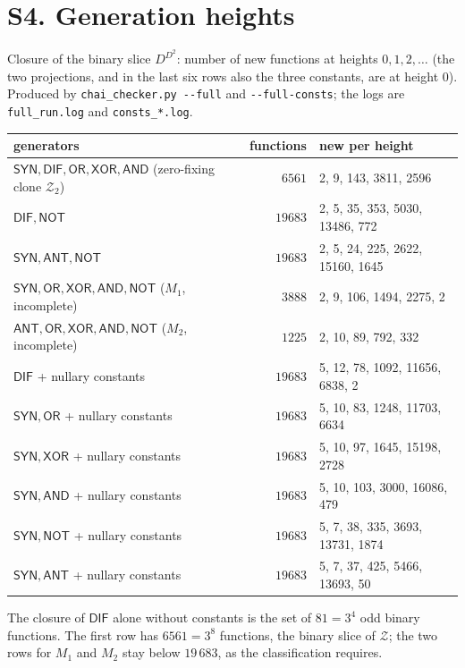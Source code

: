 \documentclass[10pt,a4paper]{article}
\newcommand{\D}{D}\newcommand{\Z}{\mathcal Z}\newcommand{\SYN}{\mathsf{SYN}}\newcommand{\DIF}{\mathsf{DIF}}\newcommand{\OR}{\mathsf{OR}}\newcommand{\XOR}{\mathsf{XOR}}\newcommand{\AND}{\mathsf{AND}}\newcommand{\NOT}{\mathsf{NOT}}\newcommand{\ANT}{\mathsf{ANT}}\newcommand{\MAX}{\mathsf{MAX}}\newcommand{\MIN}{\mathsf{MIN}}\newcommand{\MAG}{\mathsf{MAG}}\newcommand{\chai}{Chai}\newcommand{\Fone}{\mathcal F_1}\newcommand{\Ftwo}{\mathcal F_2}\usepackage{tikz}\usetikzlibrary{arrows.meta,positioning}\newcommand{\yang}{\rule{0.8em}{0.18ex}}\newcommand{\yin}{\rule{0.25em}{0.18ex}\hspace{0.3em}\rule{0.25em}{0.18ex}}\newcommand{\tri}[3]{\raisebox{-0.01ex}{\shortstack[c]{#1\\[-0.3ex]#2\\[-0.3ex]#3}}}\newcommand{\iv}[1]{[\![#1]\!]}
\begin{document}
\section*{S4. Generation heights}
Closure of the binary slice $\D^{\D^2}$: number of new functions at heights $0,1,2,\dots$ (the two projections, and in the last six rows also the three constants, are at height $0$). Produced by \texttt{chai\_checker.py -{}-full} and \texttt{-{}-full-consts}; the logs are \texttt{full\_run.log} and \texttt{consts\_*.log}.
\begin{center}\small\begin{tabular}{lrl}\toprule
generators & functions & new per height\\\midrule
$\SYN,\DIF,\OR,\XOR,\AND$ (zero-fixing clone $\Z_2$)&$6561$&2, 9, 143, 3811, 2596\\
$\DIF,\NOT$&$19683$&2, 5, 35, 353, 5030, 13486, 772\\
$\SYN,\ANT,\NOT$&$19683$&2, 5, 24, 225, 2622, 15160, 1645\\
$\SYN,\OR,\XOR,\AND,\NOT$ ($M_1$, incomplete)&$3888$&2, 9, 106, 1494, 2275, 2\\
$\ANT,\OR,\XOR,\AND,\NOT$ ($M_2$, incomplete)&$1225$&2, 10, 89, 792, 332\\
$\DIF$ + nullary constants&$19683$&5, 12, 78, 1092, 11656, 6838, 2\\
$\SYN,\OR$ + nullary constants&$19683$&5, 10, 83, 1248, 11703, 6634\\
$\SYN,\XOR$ + nullary constants&$19683$&5, 10, 97, 1645, 15198, 2728\\
$\SYN,\AND$ + nullary constants&$19683$&5, 10, 103, 3000, 16086, 479\\
$\SYN,\NOT$ + nullary constants&$19683$&5, 7, 38, 335, 3693, 13731, 1874\\
$\SYN,\ANT$ + nullary constants&$19683$&5, 7, 37, 425, 5466, 13693, 50\\
\bottomrule\end{tabular}\end{center}
The closure of $\DIF$ alone without constants is the set of $81=3^4$ odd binary functions. The first row has $6561=3^8$ functions, the binary slice of $\Z$; the two rows for $M_1$ and $M_2$ stay below $19\,683$, as the classification requires.
\end{document}
